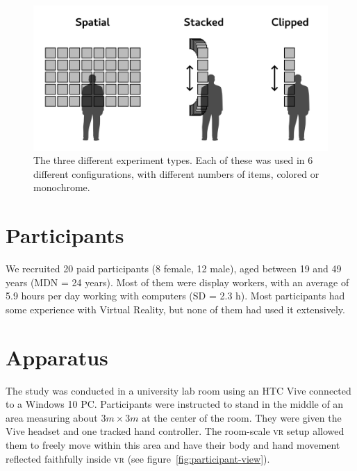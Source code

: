 \documentclass{tufte-book} %
\begin{document}
\begin{figure}
  \includegraphics{types.png}
  \caption{The three different experiment types. Each of these was used in 6 different configurations, with different numbers of items, colored or monochrome.}
  \label{fig:experiment-types}
\end{figure}

\section{Participants}
We recruited 20 paid participants (8 female, 12 male), aged between 19 and 49 years (MDN = 24 years). Most of them were display workers, with an average of 5.9 hours per day working with computers (SD = 2.3 h). Most participants had some experience with Virtual Reality, but none of them had used it extensively.

\section{Apparatus}
The study was conducted in a university lab room using an HTC Vive connected to a Windows 10 PC. Participants were instructed to stand in the middle of an area measuring about $3m \times 3m$ at the center of the room. They were given the Vive headset and one tracked hand controller. The room-scale \textsc{vr} setup allowed them to freely move within this area and have their body and hand movement reflected faithfully inside \textsc{vr} (see figure~\ref{fig:participant-view}).
\end{document}
